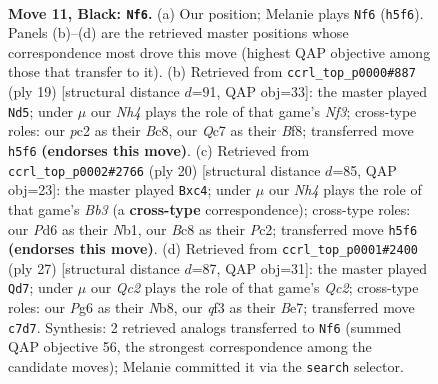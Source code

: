 \documentclass[11pt]{article}
\begin{document}
\clearpage

\begin{figure}[p]\centering
\begin{subfigure}{0.46\textwidth}\centering
\resizebox{\linewidth}{!}{%
\newchessgame
\chessboard[
  setfen={rnb1k2r/ppq1p1bp/3p2p1/4p2n/4P1P1/2N1BQ2/PPP2P1P/2KR1B1R b kq - 0 11},
  showmover=false,
  pgfstyle=straightmove, color=movearrow, markmove={h5-f6}
]}
\caption{}
\end{subfigure}\hfill
\begin{subfigure}{0.46\textwidth}\centering
\resizebox{\linewidth}{!}{%
\newchessgame
\chessboard[
  setfen={r1b1kb1r/2q2ppp/p1p1pn2/1p2P3/8/2N1B3/PPPQ1PPP/2KR1B1R b kq - 0 10},
  showmover=false,
  pgfstyle=straightmove, color=movearrow, markmove={f6-d5}
]}
\caption{}
\end{subfigure}
\\[4pt]
\begin{subfigure}{0.46\textwidth}\centering
\resizebox{\linewidth}{!}{%
\newchessgame
\chessboard[
  setfen={rnbq1rk1/pp2ppbp/1n4p1/4P3/2p5/1B3N1P/PPP1QPP1/RNB2RK1 w - - 0 11},
  showmover=false,
  pgfstyle=straightmove, color=movearrow, markmove={b3-c4}
]}
\caption{}
\end{subfigure}\hfill
\begin{subfigure}{0.46\textwidth}\centering
\resizebox{\linewidth}{!}{%
\newchessgame
\chessboard[
  setfen={rn2k2r/1pq1bpp1/p2p3p/3Ppb2/P3N3/2R1B3/1PP2PPP/3QKB1R b Kkq - 3 14},
  showmover=false,
  pgfstyle=straightmove, color=movearrow, markmove={c7-d7}
]}
\caption{}
\end{subfigure}
\caption{\textbf{Move 11, Black: \texttt{Nf6}.} (a) Our position; Melanie plays \texttt{Nf6} (\texttt{h5f6}). Panels (b)--(d) are the retrieved master positions whose correspondence most drove this move (highest QAP objective among those that transfer to it). (b) Retrieved from \texttt{ccrl\_top\_p0000\#887} (ply 19) [structural distance $d$=91, QAP obj=33]: the master played \texttt{Nd5}; under $\mu$ our \emph{Nh4} plays the role of that game's \emph{Nf3}; cross-type roles: our \emph{p}c2 as their \emph{B}c8, our \emph{Q}c7 as their \emph{B}f8; transferred move \texttt{h5f6} \textbf{(endorses this move)}. (c) Retrieved from \texttt{ccrl\_top\_p0002\#2766} (ply 20) [structural distance $d$=85, QAP obj=23]: the master played \texttt{Bxc4}; under $\mu$ our \emph{Nh4} plays the role of that game's \emph{Bb3} (a \textbf{cross-type} correspondence); cross-type roles: our \emph{P}d6 as their \emph{N}b1, our \emph{B}c8 as their \emph{P}c2; transferred move \texttt{h5f6} \textbf{(endorses this move)}. (d) Retrieved from \texttt{ccrl\_top\_p0001\#2400} (ply 27) [structural distance $d$=87, QAP obj=31]: the master played \texttt{Qd7}; under $\mu$ our \emph{Qc2} plays the role of that game's \emph{Qc2}; cross-type roles: our \emph{P}g6 as their \emph{N}b8, our \emph{q}f3 as their \emph{B}e7; transferred move \texttt{c7d7}. Synthesis: 2 retrieved analogs transferred to \texttt{Nf6} (summed QAP objective 56, the strongest correspondence among the candidate moves); Melanie committed it via the \texttt{search} selector.}
\label{fig:thought-m21}
\end{figure}
\end{document}
